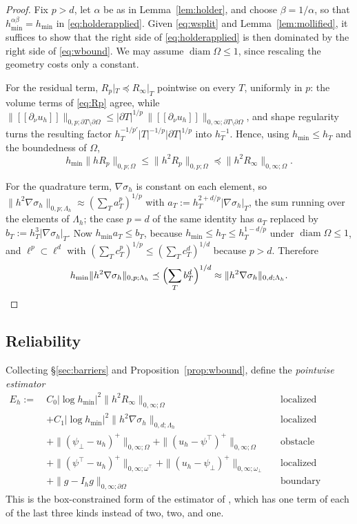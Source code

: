 \documentclass[12pt]{amsart}
\theoremstyle{definition}
\newcommand{\Om}{\Omega}
\newcommand{\dOm}{\partial\Omega}
\newcommand{\psilo}{\psi_\bot}
\newcommand{\psiup}{\psi^\top}
\newcommand{\Ih}{I_h}
\newcommand{\jump}[1]{[\![#1]\!]}
\newcommand{\Lamh}{\Lambda_h}
\newcommand{\ombot}{\omega_\bot}
\newcommand{\omtop}{\omega^\top}
\begin{document}
\begin{proof}
Fix $p > d$, let $\alpha$ be as in Lemma~\ref{lem:holder}, and choose $\beta = 1/\alpha$, so that $h_{\min}^{\alpha\beta} = h_{\min}$ in \eqref{eq:holderapplied}.  Given \eqref{eq:wsplit} and Lemma~\ref{lem:mollified}, it suffices to show that the right side of \eqref{eq:holderapplied} is then dominated by the right side of \eqref{eq:wbound}.  We may assume $\operatorname{diam}\Om \le 1$, since rescaling the geometry costs only a constant.

For the residual term, $R_p|_T \preceq R_\infty|_T$ pointwise on every $T$, uniformly in $p$: the volume terms of \eqref{eq:Rp} agree, while $\|\jump{\partial_\nu u_h}\|_{0,p;\partial T\setminus\dOm} \le |\partial T|^{1/p}\,\|\jump{\partial_\nu u_h}\|_{0,\infty;\partial T\setminus\dOm}$, and shape regularity turns the resulting factor $h_T^{-1/p'}|T|^{-1/p}|\partial T|^{1/p}$ into $h_T^{-1}$.  Hence, using $h_{\min}\le h_T$ and the boundedness of $\Om$,
\[
  h_{\min}\|hR_p\|_{0,p;\Om} \le \|h^2R_p\|_{0,p;\Om} \preceq \|h^2R_\infty\|_{0,\infty;\Om}.
\]

For the quadrature term, $\nabla\sigma_h$ is constant on each element, so $\|h^2\nabla\sigma_h\|_{0,p;\Lamh} \approx (\sum_T a_T^p)^{1/p}$ with $a_T := h_T^{2+d/p}|\nabla\sigma_h|_T$, the sum running over the elements of $\Lamh$; the case $p=d$ of the same identity has $a_T$ replaced by $b_T := h_T^{3}|\nabla\sigma_h|_T$.  Now $h_{\min} a_T \le b_T$, because $h_{\min} \le h_T \le h_T^{1-d/p}$ under $\operatorname{diam}\Om\le 1$, and $\ell^p \subset \ell^d$ with $(\sum_T c_T^p)^{1/p} \le (\sum_T c_T^d)^{1/d}$ because $p > d$.  Therefore
\[
  h_{\min}\|h^2\nabla\sigma_h\|_{0,p;\Lamh} \preceq \Bigl(\sum_T b_T^d\Bigr)^{1/d} \approx \|h^2\nabla\sigma_h\|_{0,d;\Lamh}. \qedhere
\]
\end{proof}


\subsection{Reliability}

Collecting \S \ref{sec:barriers} and Proposition~\ref{prop:wbound}, define the \emph{pointwise estimator}
\begin{equation}
\label{eq:Eh}
\begin{aligned}
  E_h := \ & C_0 |\log h_{\min}|^2 \|h^2 R_\infty\|_{0,\infty;\Om}
    && \text{localized residual} \\
  &+ C_1 |\log h_{\min}|^2 \|h^2\nabla\sigma_h\|_{0,d;\Lamh}
    && \text{localized quadrature} \\
  &+ \|(\psilo-u_h)^+\|_{0,\infty;\Om} + \|(u_h-\psiup)^+\|_{0,\infty;\Om}
    && \text{obstacle admissibility} \\
  &+ \|(\psiup-u_h)^+\|_{0,\infty;\omtop} + \|(u_h-\psilo)^+\|_{0,\infty;\ombot}
    && \text{localized detachment} \\
  &+ \|g-\Ih g\|_{0,\infty;\dOm}
    && \text{boundary datum.}
\end{aligned}
\end{equation}
This is the box-constrained form of the estimator of \cite[\S 5.2]{NSV03}, which has one term of each of the last three kinds instead of two, two, and one.
\end{document}
